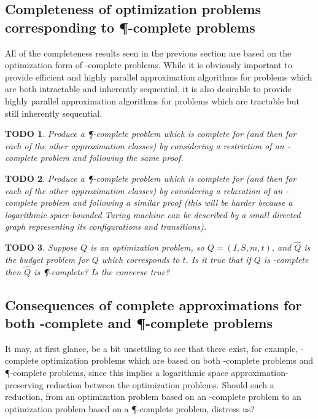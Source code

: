 \documentclass[]{article}
\theoremstyle{plain}
\newtheorem{todo}{TODO}
\theoremstyle{definition}
\begin{document}
\subsection{Completeness of optimization problems corresponding to \texorpdfstring{\P}{P}-complete problems}
\label{sec:pcompleteapprox}

All of the completeness results seen in the previous section are based on the optimization form of \NP-complete problems.
While it is obviously important to provide efficient and highly parallel approximation algorithms for problems which are both intractable and inherently sequential, it is also desirable to provide highly parallel approximation algorithms for problems which are tractable but still inherently sequential.

\begin{todo}
  Produce a \P-complete problem which is complete for \ApxNCO{} (and then for each of the other approximation classes) by considering a restriction of an \NP-complete problem and following the same proof.
\end{todo}

\begin{todo}
  Produce a \P-complete problem which is complete for \ApxNCO{} (and then for each of the other approximation classes) by considering a relaxation of an \NL-complete problem and following a similar proof (this will be harder because a logarithmic space-bounded Turing machine can be described by a small directed graph representing its configurations and transitions).
\end{todo}

\begin{todo}
  Suppose $Q$ is an optimization problem, so $Q=(I, S, m, t)$, and $\hat{Q}$ is the budget problem for $Q$ which corresponds to $t$.
  Is it true that if $Q$ is \PO-complete then $\hat{Q}$ is \P-complete?
  Is the converse true?
\end{todo}

\subsection{Consequences of complete approximations for both \texorpdfstring{\NP}{NP}-complete and \texorpdfstring{\P}{P}-complete problems}

It may, at first glance, be a bit unsettling to see that there exist, for example, \ApxNCO-complete optimization problems which are based on both \NP-complete problems and \P-complete problems, since this implies a logarithmic space approximation-preserving reduction between the optimization problems.
Should such a reduction, from an optimization problem based on an \NP-complete problem to an optimization problem based on a \P-complete problem, distress us?
\end{document}

